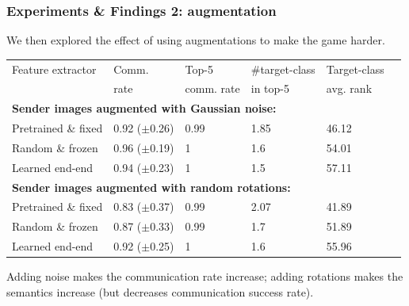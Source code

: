 \documentclass[\beamerclass,aspectratio=1610]{beamer}
\begin{document}
\begin{frame}
\frametitle{Experiments \& Findings 2: augmentation}
We then explored the effect of using augmentations to make the game harder.\\[1em]
\pause
\centering
\begin{tabular}{llllll}
\hline
 Feature extractor & Comm. & Top-5 & \#target-class  & Target-class \\
   & rate & comm. rate & in top-5 & avg. rank \\
\hline
\multicolumn{5}{l}{\textbf{Sender images augmented with Gaussian noise:}}\\
  Pretrained \& fixed & 0.92 ($\pm$0.26) & 0.99 & 1.85 & 46.12\\

  Random \& frozen & 0.96 ($\pm$0.19) & 1 & 1.6 & 54.01\\

  Learned end-end & 0.94 ($\pm$0.23) & 1 & 1.5 & 57.11\\
\hline
\multicolumn{5}{l}{\textbf{Sender images augmented with random rotations:}}\\
  Pretrained \& fixed & 0.83 ($\pm$0.37) & 0.99 &2.07 &41.89\\

  Random \& frozen & 0.87 ($\pm$0.33) & 0.99 &1.7 &51.89\\

  Learned end-end & 0.92 ($\pm$0.25) & 1 & 1.6 &55.96\\
\hline
\end{tabular}

\begin{block}{}
Adding noise makes the communication rate increase; adding rotations makes the semantics increase (but decreases communication success rate).
\end{block}

\end{frame}
\end{document}
